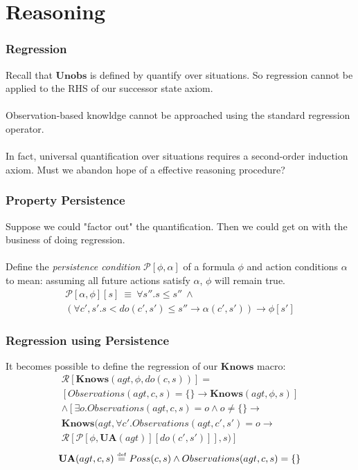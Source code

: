 \documentclass{beamer}
\newcommand{\isdef}{\hbox{$\stackrel{\mbox{\tiny def}}{=}$}}
\begin{document}
\section{Reasoning}

\begin{frame}
\frametitle{Regression}
Recall that $\mathbf{Unobs}$ is defined by quantify over situations.
So regression cannot be applied to the RHS of our successor state axiom.
\ \\
\ \\
Observation-based knowldge \alert{cannot} be approached using
the standard regression operator.
\ \\
\ \\
\pause
In fact, universal quantification over situations requires a
second-order induction axiom.
Must we abandon hope of a effective reasoning procedure?
\end{frame}

\begin{frame}
\frametitle{Property Persistence}
Suppose we could "factor out" the quantification. Then we could get
on with the business of doing regression. 
\ \\
\ \\
Define the \emph{persistence condition} $\mathcal{P}[\phi,\alpha]$ of a formula
 $\phi$ and action conditions $\alpha$ to mean: assuming all future actions
satisfy $\alpha$, $\phi$ will remain true.
\begin{multline*}
  \mathcal{P}[\alpha,\phi][s]\ \equiv\ \forall s''.s \leq s'' \ \wedge\\
    \left( \forall c',s' . s<do(c',s')\leq s'' \rightarrow \alpha (c',s') \right) \rightarrow \phi[s']
\end{multline*}
\end{frame}

\begin{frame}
\frametitle{Regression using Persistence}
It becomes possible to define the regression of our $\mathbf{Knows}$ macro:
\begin{multline*}
  \mathcal{R}[\mathbf{Knows}(agt,\phi,do(c,s))] = \\
     \left[ Observations(agt,c,s) = \{\} \rightarrow \mathbf{Knows}(agt,\phi,s) \right] \\
     \wedge \left[ \exists o . Observations(agt,c,s) = o \wedge o\neq \{\} \rightarrow \right. \\
     \mathbf{Knows}(agt,\forall c' . Observations(agt,c',s')=o \rightarrow \\
     \left.\mathcal{R}[\mathcal{P}[\phi,\mathbf{UA}(agt)][do(c',s')]],s)\right]
\end{multline*}
\begin{equation*}
  \mathbf{UA}(agt,c,s)\ \isdef\ Poss(c,s) \wedge Observations(agt,c,s) = \{\}
\end{equation*}
\end{frame}
\end{document}
